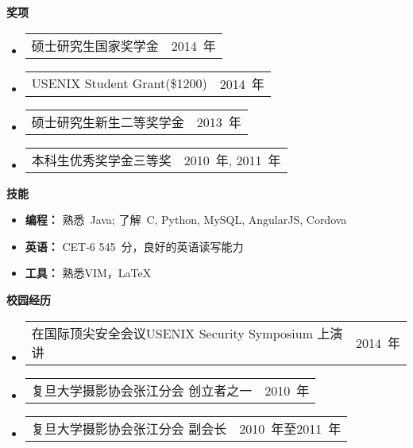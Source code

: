 \documentclass[letterpaper,10pt]{article}
\makeatletter
\newcommand{\resheading}[1]{{\large \colorbox{mygrey}{\begin{minipage}{\textwidth}{\textbf{#1 \vphantom{p\^{E}}}}\end{minipage}}}}
\newcommand{\cvitem}[2]{
\begin{tabular*}{6.5in}{l@{\extracolsep{\fill}}r}
		#1 & #2 \\
\end{tabular*}\vspace{-1pt}}
\makeatother
\begin{document}
\resheading{奖项}
	\begin{itemize}
		\item \cvitem{硕士研究生国家奖学金}{2014~年}
		\item \cvitem{USENIX Student Grant(\$1200)}{2014~年}
		\item \cvitem{硕士研究生新生二等奖学金}{2013~年}
		\item \cvitem{本科生优秀奖学金三等奖}{2010~年, 2011~年}
	\end{itemize}


\resheading{{技能}}
	\begin{itemize}
		\item
            \textbf{编程：} 熟悉~Java; 了解~C, Python, MySQL, AngularJS, Cordova %
        \item
            \textbf{英语：} CET-6 545~分，良好的英语读写能力
        \item 
        	\textbf{工具：} 熟悉VIM，\LaTeX
	\end{itemize} %


\resheading{校园经历}
\begin{itemize}
	\item \cvitem{在国际顶尖安全会议USENIX Security Symposium 上演讲}{2014~年}
	\item \cvitem{复旦大学摄影协会张江分会 创立者之一}{2010~年}
	\item \cvitem{复旦大学摄影协会张江分会 副会长}{2010~年至2011~年}
\end{itemize}
\end{document}
